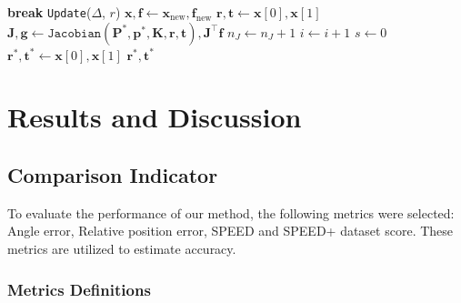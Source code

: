 \documentclass[a4paper,fleqn]{cas-sc}
\begin{document}
\begin{algorithm}
\begin{algorithmic}[1]
		\STATE \textbf{break}
		\ENDIF
		\STATE \texttt{Update}($\Delta$, $r$)
		\ENDWHILE
		\STATE $\mathbf{x}, \mathbf{f} \gets \mathbf{x}_{\text{new}}, \mathbf{f}_{\text{new}}$
		\STATE $\mathbf{r}, \mathbf{t} \gets \mathbf{x}[0], \mathbf{x}[1]$
		\STATE $\mathbf{J}, \mathbf{g} \gets \texttt{Jacobian}(\mathbf{P}^*, \mathbf{p}^*, \mathbf{K}, \mathbf{r}, \mathbf{t}), \mathbf{J}^\top \mathbf{f}$
		\STATE $n_J \gets n_J + 1$
		\ENDIF
		\STATE $i \gets i + 1$
		\ENDWHILE
		\STATE $s \gets 0$
		\ENDIF
		\STATE $\mathbf{r}^*, \mathbf{t}^* \gets \mathbf{x}[0], \mathbf{x}[1]$
		\RETURN $\mathbf{r}^*, \mathbf{t}^*$
	\end{algorithmic}
\end{algorithm}


\section{Results and Discussion} \label{sec:experiments}

\subsection{Comparison Indicator}

To evaluate the performance of our method, the following metrics were selected: Angle error, Relative position error, SPEED and SPEED+ dataset score. These metrics are utilized to estimate accuracy.

\subsubsection{Metrics Definitions}
\end{document}
